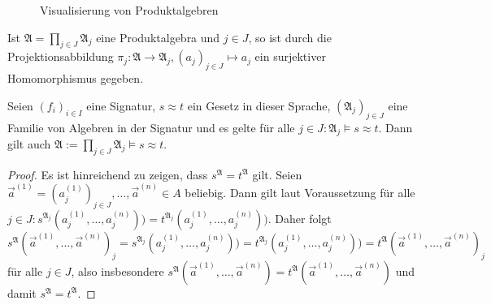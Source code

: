 \begin{figure}[H]
    \caption{Visualisierung von Produktalgebren}
    \label{fig:produktalgebra}
\end{figure}

\begin{remark}
    Ist $\mathfrak{A}=\prod_{j\in J}\mathfrak{A}_j$ eine Produktalgebra und $j\in J$, so ist durch die Projektionsabbildung
    $\pi_j:\mathfrak{A}\to \mathfrak{A}_j, (a_j)_{j \in J}\mapsto a_j$ ein surjektiver Homomorphismus gegeben.
\end{remark}

\begin{proposition}
    Seien $(f_i)_{i\in I}$ eine Signatur, $s\approx t$ ein Gesetz in dieser Sprache, $(\mathfrak{A}_j)_{j\in J}$
    eine Familie von Algebren in der Signatur und es gelte für alle $j\in J:\mathfrak{A}_j\models s\approx t$.
    Dann gilt auch $\mathfrak{A}:=\prod_{j\in J}\mathfrak{A}_j\models s\approx t$.
\end{proposition}

\begin{proof}
    Es ist hinreichend zu zeigen, dass $s^\mathfrak{A}=t^\mathfrak{A}$ gilt. Seien $\vec a^{(1)} = (a_j^{(1)})_{j \in J}, \ldots,\vec a^{(n)}\in A$ beliebig.
    Dann gilt laut Voraussetzung für alle $j\in J:s^{\mathfrak{A}_j}(a^{(1)}_j,\ldots,a^{(n)}_j)) = t^{\mathfrak{A}_j}(a^{(1)}_j,\ldots,a^{(n)}_j))$.
    Daher folgt $s^\mathfrak{A}(\vec a^{(1)},\ldots,\vec a^{(n)})_j=s^{\mathfrak{A}_j}(a^{(1)}_j,\ldots,a^{(n)}_j)) = t^{\mathfrak{A}_j}(a^{(1)}_j,\ldots,a^{(n)}_j))=t^\mathfrak{A}(\vec a^{(1)},\ldots,\vec a^{(n)})_j$
    für alle $j\in J$, also insbesondere $s^\mathfrak{A}(\vec a^{(1)},\ldots,\vec a^{(n)})=t^\mathfrak{A}(\vec a^{(1)},\ldots,\vec a^{(n)})$ und damit $s^\mathfrak{A}=t^\mathfrak{A}.$
\end{proof}


